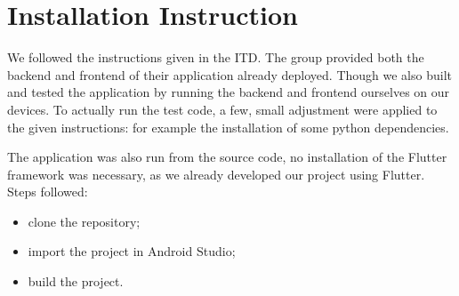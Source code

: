 \chapter{Installation Instruction}
We followed the instructions given in the ITD. The group provided both the backend and frontend of their application already deployed.
Though we also built and tested the application by running the backend and frontend ourselves on our devices.\newline
To actually run the test code, a few, small adjustment were applied to the given instructions: for example the installation of some python dependencies.

The application was also run from the source code, no installation of the Flutter framework was necessary, as we already developed our project using Flutter. Steps followed:
\begin{itemize}
	\item clone the repository;
	\item import the project in Android Studio;
	\item build the project.
\end{itemize}
